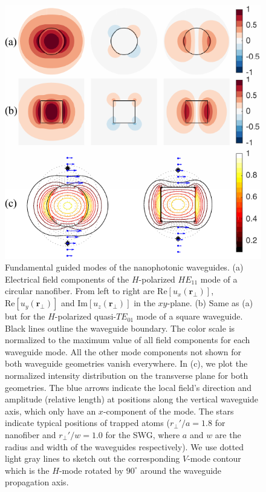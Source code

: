 \documentclass[preprint,aps,pra,onecolumn,superscriptaddress]{revtex4-1} %
\def\br{\mathbf{r}}
\begin{document}
\begin{figure}[htb]
\centering
  \includegraphics[width=.49\textwidth]{fig/nanofiberswg_Hmode6}
  \caption{Fundamental guided modes of the nanophotonic waveguides. (a) Electrical field components of the $H$-polarized $HE_{11}$ mode of a circular nanofiber. From left to right are $ \mathrm{Re}[u_x(\br\!_\perp)] $, $ \mathrm{Re}[u_y(\br\!_\perp)] $ and $ \mathrm{Im}[u_z(\br\!_\perp)] $ in the $ xy $-plane. (b) Same as (a) but for  the $H$-polarized quasi-$TE_{01}$ mode of a square waveguide. Black lines outline the waveguide boundary. The color scale is normalized to the maximum value of all field components for each waveguide mode. All the other mode components not shown for both waveguide geometries vanish everywhere. In (c), we plot the normalized intensity distribution on the transverse plane for both geometries. The blue arrows indicate the local field's direction and amplitude (relative length) at positions along the vertical waveguide axis, which only have an $ x $-component of the mode. The stars indicate typical positions of trapped atoms ($r_\perp'/a=1.8  $ for nanofiber and $ r_\perp'/w=1.0 $ for the SWG, where $ a $ and $ w $ are the radius and width of the waveguides respectively). We use dotted light gray lines to sketch out the corresponding $ V $-mode contour which is the $ H $-mode rotated by $ 90^\circ $ around the waveguide propagation axis. }\label{fig:nanofiberSWG_E_ints}
\end{figure}
\end{document}
